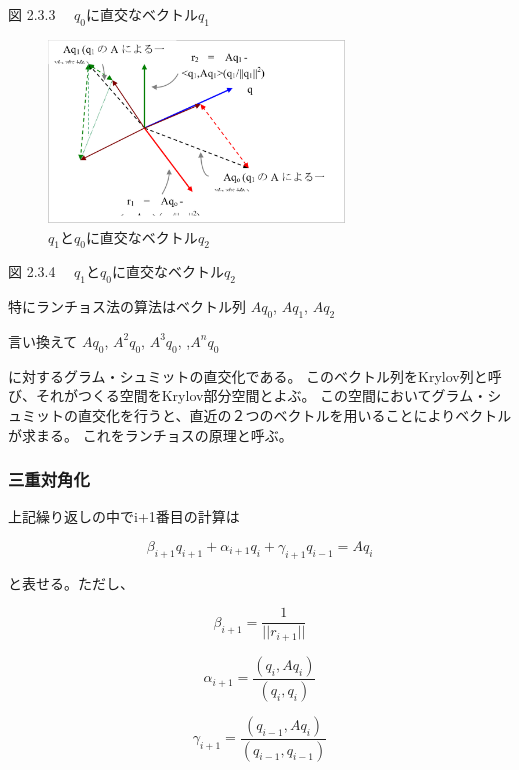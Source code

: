\documentclass[a4paper,pandoc,ja=standard]{bxjsarticle}
\begin{document}
図 2.3.3　 \(q_0\)に直交なベクトル\(q_1\)

\begin{figure}
\centering
\includegraphics[width=0.7\textwidth,height=\textheight]{media/theory05_04.png}
\caption{\(q_1\)と\(q_0\)に直交なベクトル\(q_2\)}
\end{figure}

図 2.3.4　 \(q_1\)と\(q_0\)に直交なベクトル\(q_2\)

特にランチョス法の算法はベクトル列 \(A q_0\), \(A q_1\), \(A q_2\)

言い換えて \(A q_0\), \(A^2 q_0\), \(A^3 q_0\), ,\(A^n q_0\)

に対するグラム・シュミットの直交化である。
このベクトル列をKrylov列と呼び、それがつくる空間をKrylov部分空間とよぶ。
この空間においてグラム・シュミットの直交化を行うと、直近の２つのベクトルを用いることによりベクトルが求まる。
これをランチョスの原理と呼ぶ。

\hypertarget{ux4e09ux91cdux5bfeux89d2ux5316}{%
\subsubsection{三重対角化}\label{ux4e09ux91cdux5bfeux89d2ux5316}}

上記繰り返しの中でi+1番目の計算は

\begin{equation}
\beta_{i+1} q_{i+1} + \alpha_{i+1} q_{i} + \gamma_{i+1} q_{i-1} = Aq_{i}
\label{eq:2.3.11}
\end{equation}

と表せる。ただし、

\[
\beta_{i+1} = \frac{1}{||r_{i+1}||}
\]

\[
\alpha_{i+1} = \frac{(q_i, Aq_i)}{(q_i, q_i)}
\]

\begin{equation}
\gamma_{i+1} = \frac{(q_{i-1}, Aq_i)}{(q_{i-1}, q_{i-1})}
\label{eq:2.3.12}
\end{equation}
\end{document}
